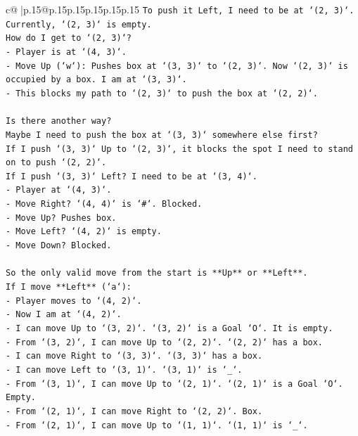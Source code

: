 \documentclass{article}
\begin{document}
{\begin{supertabular}{c@{$\;$}|p{.15\linewidth}@{}p{.15\linewidth}p{.15\linewidth}p{.15\linewidth}p{.15\linewidth}p{.15\linewidth}}
{{{\texttt{To push it Left, I need to be at `(2, 3)`.} \\
\texttt{Currently, `(2, 3)` is empty.} \\
\texttt{How do I get to `(2, 3)`?} \\
\texttt{{-} Player is at `(4, 3)`.} \\
\texttt{{-} Move Up (`w`): Pushes box at `(3, 3)` to `(2, 3)`. Now `(2, 3)` is occupied by a box. I am at `(3, 3)`.} \\
\texttt{{-} This blocks my path to `(2, 3)` to push the box at `(2, 2)`.} \\
\\ 
\texttt{Is there another way?} \\
\texttt{Maybe I need to push the box at `(3, 3)` somewhere else first?} \\
\texttt{If I push `(3, 3)` Up to `(2, 3)`, it blocks the spot I need to stand on to push `(2, 2)`.} \\
\texttt{If I push `(3, 3)` Left? I need to be at `(3, 4)`.} \\
\texttt{{-} Player at `(4, 3)`.} \\
\texttt{{-} Move Right? `(4, 4)` is `\#`. Blocked.} \\
\texttt{{-} Move Up? Pushes box.} \\
\texttt{{-} Move Left? `(4, 2)` is empty.} \\
\texttt{{-} Move Down? Blocked.} \\
\\ 
\texttt{So the only valid move from the start is **Up** or **Left**.} \\
\texttt{If I move **Left** (`a`):} \\
\texttt{{-} Player moves to `(4, 2)`.} \\
\texttt{{-} Now I am at `(4, 2)`.} \\
\texttt{{-} I can move Up to `(3, 2)`. `(3, 2)` is a Goal `O`. It is empty.} \\
\texttt{{-} From `(3, 2)`, I can move Up to `(2, 2)`. `(2, 2)` has a box.} \\
\texttt{{-} I can move Right to `(3, 3)`. `(3, 3)` has a box.} \\
\texttt{{-} I can move Left to `(3, 1)`. `(3, 1)` is `\_`.} \\
\texttt{{-} From `(3, 1)`, I can move Up to `(2, 1)`. `(2, 1)` is a Goal `O`. Empty.} \\
\texttt{{-} From `(2, 1)`, I can move Right to `(2, 2)`. Box.} \\
\texttt{{-} From `(2, 1)`, I can move Up to `(1, 1)`. `(1, 1)` is `\_`.} \\
}}}
\end{supertabular}}
\end{document}

